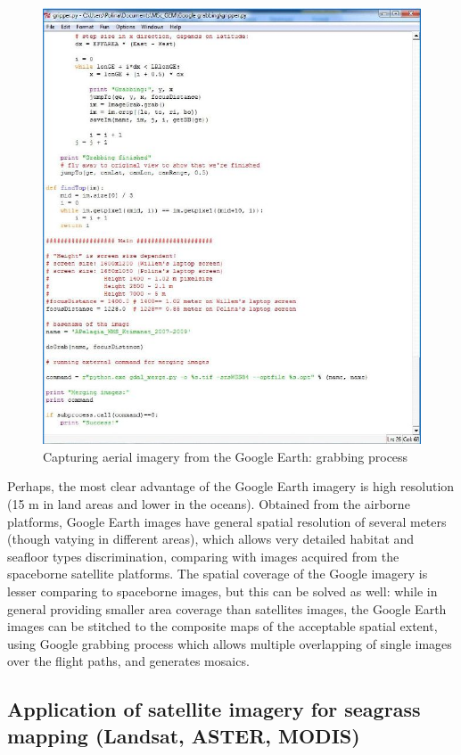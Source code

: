 \documentclass[10pt, a4paper]{article}
\begin{document}
\begin{figure}
	\centering
	\includegraphics[scale=0.27]{Fig-22.jpg}
	\caption{Capturing aerial imagery from the Google Earth: grabbing process}
	\label{fig:22}
\end{figure}

Perhaps, the most clear advantage of the Google
Earth imagery is high resolution (15 m in land areas and lower in the oceans).
Obtained from the airborne platforms, Google Earth images have general spatial
resolution of several meters (though vatying in different areas), which allows very
detailed habitat and seafloor types discrimination, comparing with images
acquired from the spaceborne satellite platforms.
The spatial coverage of the Google imagery is lesser comparing to spaceborne images, but this can be solved as
well: while in general providing smaller area coverage than satellites images, the Google Earth
images can be stitched to the composite maps of the acceptable spatial extent, using Google grabbing
process which allows multiple overlapping of single images over the flight paths, and generates
mosaics.

\subsection{Application of satellite imagery for seagrass mapping (Landsat, ASTER, MODIS)}
\end{document}
